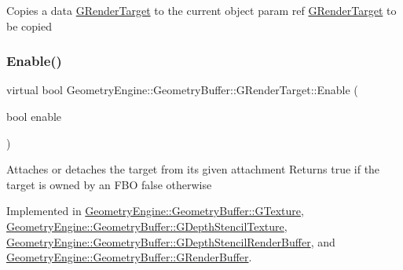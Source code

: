 Copies a data \mbox{\hyperlink{class_geometry_engine_1_1_geometry_buffer_1_1_g_render_target}{G\+Render\+Target}} to the current object param ref \mbox{\hyperlink{class_geometry_engine_1_1_geometry_buffer_1_1_g_render_target}{G\+Render\+Target}} to be copied \mbox{\label{class_geometry_engine_1_1_geometry_buffer_1_1_g_render_target_a1b8be750dfd13582d0730bf9e4c4e1d2}} 
\subsubsection{\texorpdfstring{Enable()}{Enable()}}
{\footnotesize\ttfamily virtual bool Geometry\+Engine\+::\+Geometry\+Buffer\+::\+G\+Render\+Target\+::\+Enable (\begin{DoxyParamCaption}\item[{bool}]{enable }\end{DoxyParamCaption})\hspace{0.3cm}{\ttfamily [pure virtual]}}

Attaches or detaches the target from its given attachment Returns true if the target is owned by an F\+BO false otherwise 

Implemented in \mbox{\hyperlink{class_geometry_engine_1_1_geometry_buffer_1_1_g_texture_a528604f22629785271b3f36ec18ffc78}{Geometry\+Engine\+::\+Geometry\+Buffer\+::\+G\+Texture}}, \mbox{\hyperlink{class_geometry_engine_1_1_geometry_buffer_1_1_g_depth_stencil_texture_a38a1f3219bddbab69fa338a727e0ab3a}{Geometry\+Engine\+::\+Geometry\+Buffer\+::\+G\+Depth\+Stencil\+Texture}}, \mbox{\hyperlink{class_geometry_engine_1_1_geometry_buffer_1_1_g_depth_stencil_render_buffer_ad5c121dac465229736e6159981b965cb}{Geometry\+Engine\+::\+Geometry\+Buffer\+::\+G\+Depth\+Stencil\+Render\+Buffer}}, and \mbox{\hyperlink{class_geometry_engine_1_1_geometry_buffer_1_1_g_render_buffer_afb80727ba33997fb7f48551de1831111}{Geometry\+Engine\+::\+Geometry\+Buffer\+::\+G\+Render\+Buffer}}.

\mbox{\label{class_geometry_engine_1_1_geometry_buffer_1_1_g_render_target_a42f43fba3fb8fe32e81509b5869c87e2}} 
